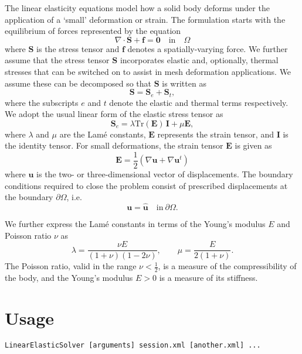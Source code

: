 The linear elasticity equations model how a solid body deforms under the
application of a `small' deformation or strain. The formulation starts with the
equilibrium of forces represented by the equation
%
\begin{equation}
\nabla \cdot \mathbf{S} + \mathbf{f} = \mathbf{0} \quad \textrm{in} \quad \Omega
\label{eq:strong}
\end{equation}
%
where $\mathbf{S}$ is the stress tensor and $\mathbf{f}$ denotes a
spatially-varying force. We further assume that the stress tensor $\mathbf{S}$
incorporates elastic and, optionally, thermal stresses that can be switched on
to assist in mesh deformation applications. We assume these can be decomposed so
that $\mathbf{S}$ is written as
%
\[
\mathbf{S} = \mathbf{S}_e + \mathbf{S}_t,
\]
%
where the subscripts $e$ and $t$ denote the elastic and thermal terms
respectively. We adopt the usual linear form of the elastic stress tensor as
%
\[
\mathbf{S}_e = \lambda\mbox{Tr}(\mathbf{E}) \, \mathbf{I} +\mu \mathbf{E},
\]
%
where $\lambda$ and $\mu$ are the Lam\'e constants, $\mathbf{E}$ represents the
strain tensor, and $\mathbf{I}$ is the identity tensor. For small deformations,
the strain tensor $\mathbf{E}$ is given as
%
\begin{equation}
\mathbf{E} =\frac{1}{2} \left ( \nabla \mathbf{u}+ \nabla \mathbf{u}^t \right )
\end{equation}
%
where $\mathbf{u}$ is the two- or three-dimensional vector of displacements. The
boundary conditions required to close the problem consist of prescribed
displacements at the boundary $\partial \Omega$, i.e.
\begin{equation}
  \mathbf{u} = \hat{\mathbf{u}} \quad \textrm{in}\ \partial \Omega.
\end{equation}

We further express the Lam\'e constants in terms of the Young's modulus $E$ and
Poisson ratio $\nu$ as
%
\[
\lambda = \frac{\nu E}{(1+\nu)(1-2\nu)}, \qquad \mu = \frac{E}{2(1+\nu)}.
\]
%
The Poisson ratio, valid in the range $\nu < \tfrac{1}{2}$, is a measure of the
compressibility of the body, and the Young's modulus $E > 0$ is a measure of its
stiffness.

\section{Usage}
\begin{lstlisting}[style=BashInputStyle]
LinearElasticSolver [arguments] session.xml [another.xml] ...
\end{lstlisting}



